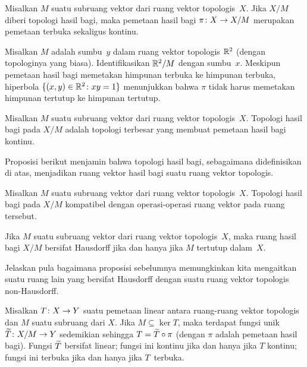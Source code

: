 \begin{prop} Misalkan $M$ suatu subruang vektor dari ruang vektor topologis~$X$. Jika $X/M$ diberi topologi hasil bagi, maka
pemetaan hasil bagi $\pi\colon X \rightarrow X/M$ merupakan pemetaan terbuka sekaligus kontinu.
\end{prop}

\begin{exam} Misalkan $M$ adalah sumbu~$y$ dalam ruang vektor topologis $\mathbb{R}^2$ (dengan topologinya yang biasa). Identifikasikan $\mathbb{R}^2/M$ dengan
sumbu~$x$. Meskipun pemetaan hasil bagi memetakan himpunan terbuka ke himpunan terbuka, hiperbola $\{(x,y) \in \mathbb{R}^2\colon xy = 1\}$ menunjukkan
bahwa $\pi$ tidak harus memetakan himpunan tertutup ke himpunan tertutup.
\end{exam}

\begin{prop}\label{prop_quotient_top_strong} Misalkan $M$ suatu subruang vektor dari ruang vektor topologis~$X$. Topologi hasil bagi
pada $X/M$ adalah topologi terbesar yang membuat pemetaan hasil bagi kontinu.
\end{prop}

Proposisi berikut menjamin bahwa topologi hasil bagi, sebagaimana didefinisikan di atas, menjadikan ruang vektor hasil bagi suatu ruang vektor topologis.

\begin{prop} Misalkan $M$ suatu subruang vektor dari ruang vektor topologis~$X$. Topologi hasil bagi pada $X/M$ kompatibel dengan
operasi-operasi ruang vektor pada ruang tersebut.
\end{prop}

\begin{prop} Jika $M$ suatu subruang vektor dari ruang vektor topologis~$X$, maka ruang hasil bagi $X/M$ bersifat Hausdorff jika dan hanya
jika $M$ tertutup dalam~$X$.
\end{prop}

\begin{exer} Jelaskan pula bagaimana proposisi sebelumnya memungkinkan kita mengaitkan suatu ruang lain yang bersifat Hausdorff dengan
suatu ruang vektor topologis non-Hausdorff.
\end{exer}

\begin{prop} Misalkan $T\colon X \rightarrow Y$ suatu pemetaan linear antara ruang-ruang vektor topologis dan $M$ suatu subruang dari $X$. Jika
$M \subseteq \ker T$, maka terdapat fungsi unik $\widetilde{T}\colon X/M \rightarrow Y$ sedemikian sehingga $T = \widetilde{T} \circ \pi$ (dengan $\pi$
adalah pemetaan hasil bagi). Fungsi $\widetilde{T}$ bersifat linear; fungsi ini kontinu jika dan hanya jika $T$ kontinu; fungsi ini terbuka jika dan hanya jika $T$~terbuka.
\end{prop}

















